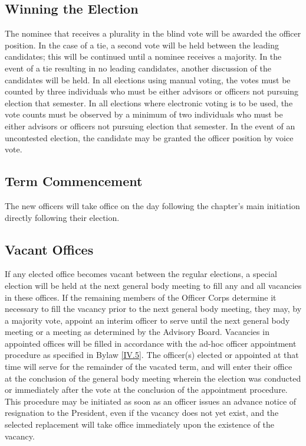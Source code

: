 \subsection{Winning the Election} \label{II.8}

The nominee that receives a plurality in the
blind vote will be awarded the officer position. In the case of a tie, a second vote will
be held between the leading candidates; this will be continued until a nominee receives a
majority. In the event of a tie resulting in no leading candidates, another discussion of the
candidates will be held. In all elections using manual voting, the votes must be counted
by three individuals who must be either advisors or officers not pursuing election that
semester. In all elections where electronic voting is to be used, the vote counts must be
observed by a minimum of two individuals who must be either advisors or officers not
pursuing election that semester. In the event of an uncontested election, the candidate may
be granted the officer position by voice vote.

\subsection{Term Commencement} \label{II.9}

The new officers will take office on the day following
the chapter’s main initiation directly following their election.


\subsection{Vacant Offices} \label{II.10}

If any elected office becomes vacant between the regular
elections, a special election will be held at the next general body meeting to fill any
and all vacancies in these offices. If the remaining members of the Officer Corps determine
it necessary to fill the vacancy prior to the next general body meeting, they may, by a
majority vote, appoint an interim officer to serve until the next general body meeting or a
meeting as determined by the Advisory Board. Vacancies in appointed offices will be filled
in accordance with the ad-hoc officer appointment procedure as specified in Bylaw \ref{IV.5}.
The officer(s) elected or appointed at that time will serve for the remainder of the vacated
term, and will enter their office at the conclusion of the general body meeting wherein the
election was conducted or immediately after the vote at the conclusion of the appointment
procedure. This procedure may be initiated as soon as an officer issues an advance notice
of resignation to the President, even if the vacancy does not yet exist, and the selected
replacement will take office immediately upon the existence of the vacancy.